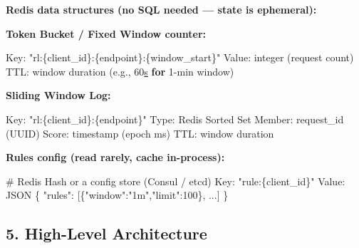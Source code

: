 \documentclass[11pt]{article}
\newenvironment{Shaded}{\begin{snugshade}}{\end{snugshade}}
\newcommand{\BuiltInTok}[1]{\textcolor[rgb]{0.50,0.55,0.55}{#1}}
\newcommand{\CommentTok}[1]{\textcolor[rgb]{0.48,0.49,0.49}{#1}}
\newcommand{\ControlFlowTok}[1]{\textcolor[rgb]{0.99,0.74,0.29}{\textbf{#1}}}
\newcommand{\DecValTok}[1]{\textcolor[rgb]{0.96,0.45,0.00}{#1}}
\newcommand{\ErrorTok}[1]{\textcolor[rgb]{0.85,0.27,0.33}{\underline{#1}}}
\newcommand{\NormalTok}[1]{\textcolor[rgb]{0.81,0.81,0.76}{#1}}
\newcommand{\OperatorTok}[1]{\textcolor[rgb]{0.81,0.81,0.76}{#1}}
\newcommand{\SpecialCharTok}[1]{\textcolor[rgb]{0.24,0.68,0.91}{#1}}
\newcommand{\StringTok}[1]{\textcolor[rgb]{0.96,0.31,0.31}{#1}}
\begin{document}
\textbf{Redis data structures (no SQL needed --- state is ephemeral):}

\textbf{Token Bucket / Fixed Window counter:}


\begin{Shaded}
\begin{Highlighting}[]
\NormalTok{Key:   }\StringTok{"rl:}\SpecialCharTok{\{client\_id\}}\StringTok{:}\SpecialCharTok{\{endpoint\}}\StringTok{:}\SpecialCharTok{\{window\_start\}}\StringTok{"}
\NormalTok{Value: integer (request count)}
\NormalTok{TTL:   window duration (e.g., }\DecValTok{60}\ErrorTok{s} \ControlFlowTok{for} \DecValTok{1}\OperatorTok{{-}}\BuiltInTok{min}\NormalTok{ window)}
\end{Highlighting}
\end{Shaded}

\textbf{Sliding Window Log:}


\begin{Shaded}
\begin{Highlighting}[]
\NormalTok{Key:   }\StringTok{"rl:}\SpecialCharTok{\{client\_id\}}\StringTok{:}\SpecialCharTok{\{endpoint\}}\StringTok{"}
\NormalTok{Type:  Redis Sorted Set}
\NormalTok{Member: request\_id (UUID)}
\NormalTok{Score:  timestamp (epoch ms)}
\NormalTok{TTL:   window duration}
\end{Highlighting}
\end{Shaded}

\textbf{Rules config (read rarely, cache in-process):}


\begin{Shaded}
\begin{Highlighting}[]
\CommentTok{\# Redis Hash or a config store (Consul / etcd)}
\NormalTok{Key:   }\StringTok{"rule:}\SpecialCharTok{\{client\_id\}}\StringTok{"}
\NormalTok{Value: JSON \{ }\StringTok{"rules"}\NormalTok{: [\{}\StringTok{"window"}\NormalTok{:}\StringTok{"1m"}\NormalTok{,}\StringTok{"limit"}\NormalTok{:}\DecValTok{100}\NormalTok{\}, ...] \}}
\end{Highlighting}
\end{Shaded}

\subsection{5. High-Level Architecture}\label{5-high-level-architecture-1}
\end{document}
